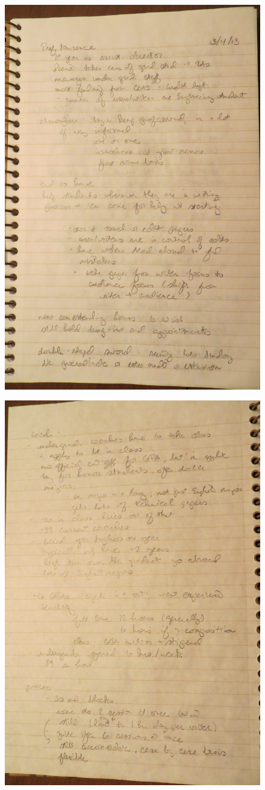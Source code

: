 \documentclass[12pt]{article} %
\begin{document}
  \begin{figure}[H]
  \centering
  \includegraphics[width=0.75\linewidth]{RAZ_raw_notes1}
  \caption{}
  \label{fig:rn1}
  \end{figure}
  \begin{figure}[H]
  \centering
  \includegraphics[width=0.75\linewidth]{RAZ_raw_notes2}
  \caption{}
  \label{fig:rn2}
  \end{figure}
\end{document}
